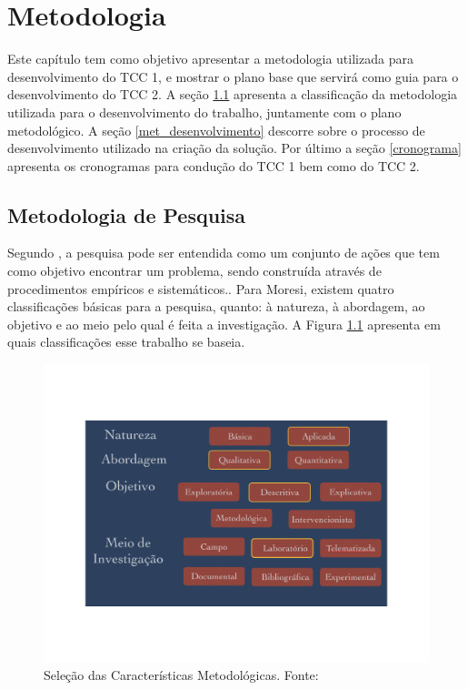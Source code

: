\chapter[Metodologia]{Metodologia}
Este capítulo tem como objetivo apresentar a metodologia utilizada para desenvolvimento do TCC 1, e mostrar o plano base que servirá como guia para o desenvolvimento do TCC 2. A seção \ref{met_pesquisa} apresenta a classificação da metodologia utilizada para o desenvolvimento do trabalho, juntamente com o plano metodológico. A seção \ref{met_desenvolvimento} descorre sobre o processo de desenvolvimento utilizado na criação da solução. Por último a seção  \ref{cronograma} apresenta os cronogramas para condução do TCC 1 bem como do TCC 2.
\section{Metodologia de Pesquisa}
\label{met_pesquisa}
Segundo \cite{moresi_metodologia_2003}, a pesquisa pode ser entendida como um conjunto de ações que tem como objetivo encontrar um problema, sendo construída através de procedimentos empíricos e sistemáticos.. Para Moresi, existem quatro classificações básicas para a pesquisa, quanto: à natureza, à abordagem, ao objetivo e ao meio pelo qual é feita a investigação. A Figura \ref{img:met_pesquisa} apresenta em quais classificações esse trabalho se baseia.
\graphicspath{{figuras/}}
\begin{figure}[h!]
\centering
\includegraphics[scale=0.50]{metodologia_pesquisa}
\caption{Seleção das Características Metodológicas. Fonte: \cite{moresi_metodologia_2003}}
\label{img:met_pesquisa}
\end{figure}

